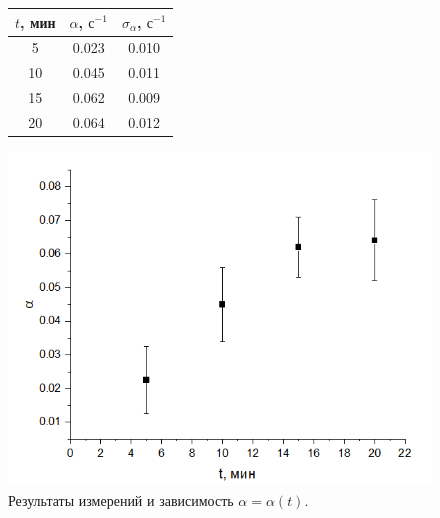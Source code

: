 \documentclass[a4paper,12pt]{article}
\begin{document}
\begin{figure}[h]
\begin{minipage}[h]{0.4\linewidth}
\begin{tabular}{|c|c|c|}
\hline
$t$, мин & $\alpha$, $\text{с}^{-1}$ & $\sigma_\alpha$, $\text{с}^{-1}$ \\ \hline
5   & 0.023    & 0.010           \\ \hline
10  & 0.045    & 0.011           \\ \hline
15  & 0.062    & 0.009           \\ \hline
20  & 0.064    & 0.012           \\ \hline
\end{tabular}
\centering
\end{minipage}
\hfill
\begin{minipage}[h]{0.7\linewidth}
\includegraphics[scale=0.7]{3.png}
\end{minipage}
\caption{Результаты измерений и зависимость $\alpha = \alpha(t)$.}
\vspace{-20pt}
\end{figure}
%
\end{document}
